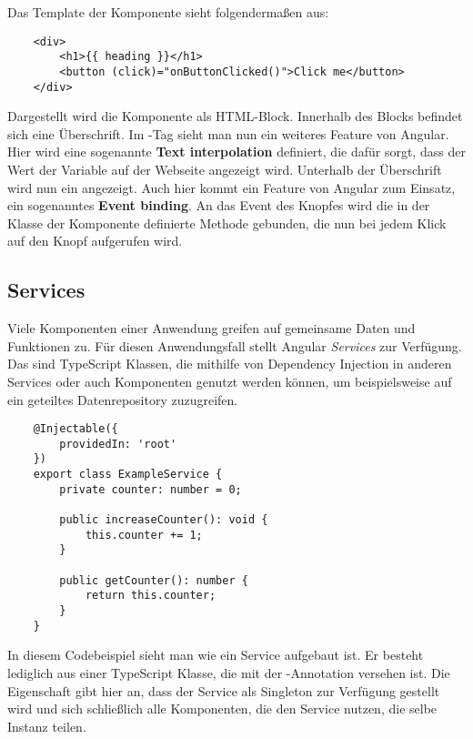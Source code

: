 Das Template der Komponente sieht folgendermaßen aus:

\begin{verbatim}
    <div>
        <h1>{{ heading }}</h1>
        <button (click)="onButtonClicked()">Click me</button>
    </div>
\end{verbatim}

Dargestellt wird die Komponente als HTML-Block. Innerhalb des Blocks befindet sich eine Überschrift. Im -Tag sieht man nun ein weiteres Feature von Angular. Hier wird eine sogenannte \textbf{Text interpolation} definiert, die dafür sorgt, dass der Wert der Variable  auf der Webseite angezeigt wird. Unterhalb der Überschrift wird nun ein  angezeigt. Auch hier kommt ein Feature von Angular zum Einsatz, ein sogenanntes \textbf{Event binding}. An das  Event des Knopfes wird die in der Klasse der Komponente definierte Methode  gebunden, die nun bei jedem Klick auf den Knopf aufgerufen wird.

\subsection{Services}

Viele Komponenten einer Anwendung greifen auf gemeinsame Daten und Funktionen zu. Für diesen Anwendungsfall stellt Angular \textit{Services} zur Verfügung. Das sind TypeScript Klassen, die mithilfe von Dependency Injection in anderen Services oder auch Komponenten genutzt werden können, um beispielsweise auf ein geteiltes Datenrepository zuzugreifen.

\begin{verbatim}
    @Injectable({
        providedIn: 'root'
    })
    export class ExampleService {
        private counter: number = 0;
        
        public increaseCounter(): void {
            this.counter += 1;
        }

        public getCounter(): number {
            return this.counter;
        }
    }
\end{verbatim}

In diesem Codebeispiel sieht man wie ein Service aufgebaut ist. Er besteht lediglich aus einer TypeScript Klasse, die mit der -Annotation versehen ist. Die Eigenschaft  gibt hier an, dass der Service als Singleton zur Verfügung gestellt wird und sich schließlich alle Komponenten, die den Service nutzen, die selbe Instanz teilen.

